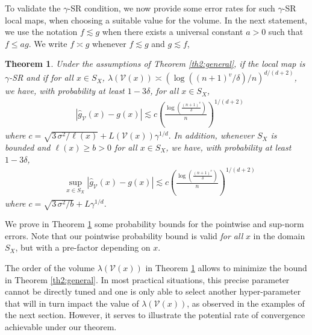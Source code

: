 \documentclass[paper=a4, fontsize=11pt]{scrartcl}
\newtheorem{theorem}{Theorem}
\begin{document}
To validate the $\gamma$-SR condition, we now provide some error rates for such $\gamma$-SR local maps, when choosing a suitable value for the volume. In the next statement, we use the notation
$ f \lesssim g $ when there exists a universal constant $ a >0$ such that 
$   f  \leq a  g .$
We write $ f \asymp g $ whenever $f\lesssim g $ and $g\lesssim f$, 

\begin{theorem}\label{main_result_localizing_map}   
Under the assumptions of Theorem \ref{th2:general}, if the local map is $\gamma$-SR and if for all $x\in S_X$,
$\lambda(\mathcal V(x) ) \asymp ({\log ( {(n+1)^v} / { \delta} ) } / { n} )  ^{d/(d+2)}$, we have, with probability at least $1 - 3\delta $, for all $x\in S_X$,
    \begin{align*}
        & | \hat g_{\mathcal V}(x) - g(x)| \lesssim c \left(\frac{\log\left( \frac{(n+1)^v}{ \delta} \right) }{ n} \right) ^{1/(d+2)}
    \end{align*}
    where $c = \sqrt{{3 \, \sigma^2}/\ell(x)} +  L(\mathcal V(x) )  \gamma^{1/d}.$ In addition, whenever $S_X$ is bounded and $ \ell(x) \geq b >0 $ for all $x\in S_X$, we have, with probability at least $1 - 3\delta $,
 \begin{align*}
        & \sup_{x\in S_X} | \hat g_{\mathcal V}(x) - g(x)| \lesssim c \left(\frac{\log\left( \frac{(n+1)^v}{ \delta} \right) }{ n} \right) ^{1/(d+2)}
    \end{align*}
    where $c = \sqrt{{3 \, \sigma^2}/b} +  L  \gamma^{1/d}.$
    \end{theorem}

 We prove in Theorem \ref{main_result_localizing_map} some probability bounds for the pointwise and sup-norm errors. Note that our pointwise probability bound is valid \textit{for all} $x$ in the domain $S_X$, but with a pre-factor depending on $x$. 


The order of the volume $\lambda(\mathcal V(x)) $ in Theorem \ref{main_result_localizing_map} allows to minimize the bound in Theorem \ref{th2:general}. In most practical situations, this precise parameter cannot be directly tuned and one is only able to select another hyper-parameter that will in turn impact the value of $\lambda(\mathcal V(x))$, as observed in the examples of the next section. However, it serves to illustrate the potential rate of convergence achievable under our theorem.
\end{document}
